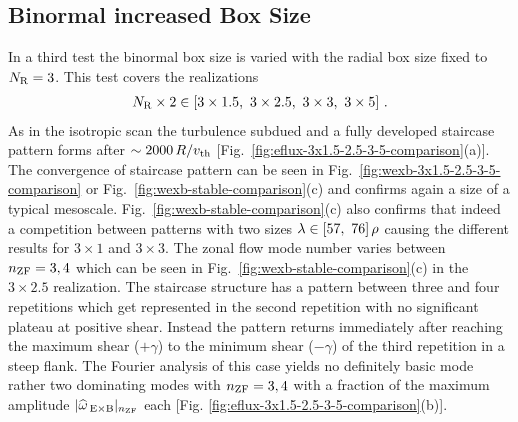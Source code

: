 
\newpage
\subsection{Binormal increased Box Size}
\label{sub:binormal}

In a third test the binormal box size is varied with the radial box size fixed to $N_\mathrm{R} = 3$.
This test covers the realizations
\begin{gather*}
	N_\mathrm{R} \times 2 \in [3\times1.5,~3\times2.5,~3\times3,~3\times5]~.
\end{gather*}
As in the isotropic scan the turbulence subdued and a fully developed staircase pattern forms after $\sim 2000\,R/v_{\mathrm{th}}$ [Fig.~\ref{fig:eflux-3x1.5-2.5-3-5-comparison}(a)]. The convergence of staircase pattern can be seen in Fig.~\ref{fig:wexb-3x1.5-2.5-3-5-comparison} or Fig.~\ref{fig:wexb-stable-comparison}(c) and confirms again a size of a typical mesoscale. Fig.~\ref{fig:wexb-stable-comparison}(c) also confirms that indeed a competition between patterns with two sizes $\lambda \in [57,~ 76]\,\rho$ causing the different results for $3 \times 1$ and $3\times 3$. The zonal flow mode number varies between $n_\mathrm{ZF} = 3,4$ which can be seen in Fig.~\ref{fig:wexb-stable-comparison}(c) in the $3\times 2.5$ realization. The staircase structure has a pattern between three and four repetitions which get represented in the second repetition with no significant plateau at positive shear. Instead the pattern returns immediately after reaching the maximum shear ($+ \gamma$) to the minimum shear ($- \gamma$) of the third repetition in a steep flank. The Fourier analysis of this case yields no definitely basic mode rather two dominating modes with $n_\mathrm{ZF} = 3, 4$ with a fraction of the maximum amplitude $|\widehat{\omega}_{\mathrm{\:E \times B}}|_{n_\mathrm{ZF}}$ each [Fig. \ref{fig:eflux-3x1.5-2.5-3-5-comparison}(b)].
\bigskip

